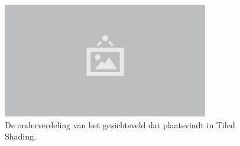 \begin{figure}
  \centering
  \includegraphics[width=0.8\textwidth]{./img/raw/placeholder.png}
  \caption{De onderverdeling van het gezichtsveld dat plaatsvindt in Tiled Shading.}
  \label{fig:ts-onderverdeling}
\end{figure}
